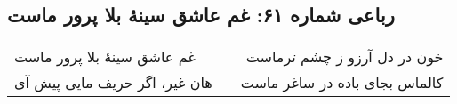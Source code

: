 \begin{center}
\section*{رباعی شماره ۶۱: غم عاشق سینهٔ بلا پرور ماست}
\label{sec:sh061}
\begin{longtable}{l p{0.5cm} r}
غم عاشق سینهٔ بلا پرور ماست
&&
خون در دل آرزو ز چشم ترماست
\\
هان غیر، اگر حریف مایی پیش آی
&&
کالماس بجای باده در ساغر ماست
\\
\end{longtable}
\end{center}

